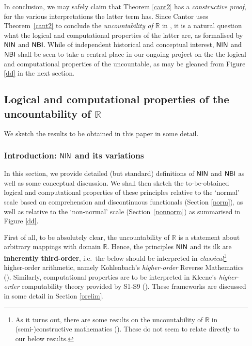 \documentclass[reqno]{amsart}
\def\R{{\mathbb  R}}
\def\NBI{\textup{\textsf{NBI}}}
\def\NIN{\textup{\textsf{NIN}}}
\numberwithin{equation}{section}
\numberwithin{thm}{section}
\begin{document}
\smallskip

In conclusion, we may safely claim that Theorem \ref{cant2} has a \emph{constructive proof}, for the various interpretations the latter term has. 
Since Cantor uses Theorem~\ref{cant2} to conclude the \emph{uncountability of $\R$} in \cite{cantor1}, it is a natural question what the logical and computational properties of the latter are, as formalised by $\NIN$ and $\NBI$.  
While of independent historical and conceptual interest, $\NIN$ and $\NBI$ shall be seen to take a central place in our ongoing project on the the logical and computational properties of the uncountable, as may be gleaned from Figure \ref{dd} in the next section.



\subsection{Logical and computational properties of the uncountability of $\R$}\label{XCX}
We sketch the results to be obtained in this paper in some detail. 
\subsubsection{Introduction: $\NIN$ and its variations}
In this section, we provide detailed (but standard) definitions of $\NIN$ and $\NBI$ as well as some conceptual discussion.  
We shall then sketch the to-be-obtained logical and computational properties of these principles relative to the `normal' scale based on comprehension and discontinuous functionals (Section \ref{norm}), as well as relative to the `non-normal' scale (Section~\ref{nonnorm}) as summarised in Figure \ref{dd}.  

\smallskip

First of all, to be absolutely clear, the uncountability of $\R$ is a statement about arbitrary mappings with domain $\R$.  Hence, the principles $\NIN$ and its ilk are \textbf{inherently third-order}, i.e.\ the below 
should be interpreted in \emph{classical}\footnote{As it turns out, there are some results on the uncountability of $\R$ in (semi-)constructive mathematics (\cites{bauer1, olipo1}).  These do not seem to relate directly to our below results.} higher-order arithmetic, namely Kohlenbach's \emph{higher-order} Reverse Mathematics (\cite{kohlenbach2}).  
Similarly, computational properties are to be interpreted in Kleene's \emph{higher-order} computability theory provided by S1-S9 (\cite{kleeneS1S9, longmann}).  These frameworks are discussed in some detail in Section \ref{prelim}.
\end{document}
